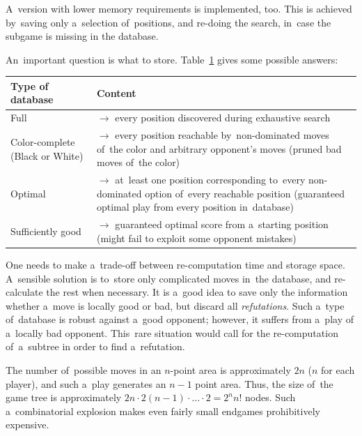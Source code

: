 A~version with lower memory requirements is implemented, too.
This is achieved by~saving only a~selection of~positions, and re-doing the search, in~case the subgame is missing in the database.

An~important question is what to store.
Table~\ref{tab:db-loc-games} gives some possible answers:
\begin{table}[!htbp]
  \centering
  \begin{tabular}{ |p{}|p{}| } 
    \hline
    \textbf{Type of database} & \textbf{Content} \\
    \hline
    Full                            & $\to$ every position discovered during exhaustive search \\
    Color-complete (Black or White) & $\to$ every position reachable by~non-dominated moves of~the color and arbitrary opponent's moves (pruned bad moves of~the color) \\
    Optimal                         & $\to$ at~least one position corresponding to~every non-dominated option of~every reachable position (guaranteed optimal play from every position in~database) \\
    Sufficiently good               & $\to$ guaranteed optimal score from a~starting position (might fail to exploit some opponent mistakes) \\
    \hline
  \end{tabular}
  \label{tab:db-loc-games}
\end{table}

One needs to make a~trade-off between re-computation time and storage space.
A~sensible solution is to~store only complicated moves in~the database, and re-calculate the rest when necessary.
It is a~good idea to save only the information whether a~move is locally good or bad, but discard all \emph{refutations}\footnotemark.
Such a~type of~database is robust against a~good opponent;
however, it suffers from a~play of a~locally bad opponent.
This~rare situation would call for the re-computation of~a~subtree in order to find a~refutation.

The number of~possible moves in an $n$-point area is approximately $2n$ ($n$ for each player), and such a~play generates an $n-1$ point area.
Thus, the size of~the game tree is approximately $2n\cdot2(n-1)\cdot \ldots \cdot2 = 2^n n!$ nodes.
Such a~combinatorial explosion makes even fairly small endgames prohibitively expensive.


